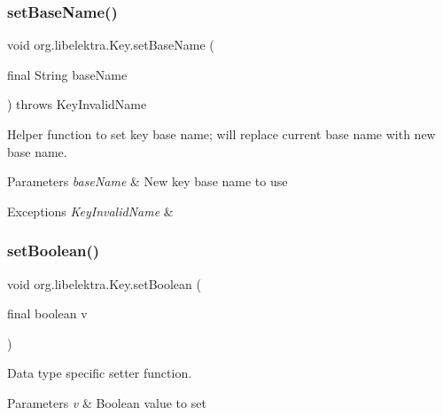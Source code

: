 \subsubsection{\texorpdfstring{set\+Base\+Name()}{setBaseName()}}
{\footnotesize\ttfamily void org.\+libelektra.\+Key.\+set\+Base\+Name (\begin{DoxyParamCaption}\item[{final String}]{base\+Name }\end{DoxyParamCaption}) throws Key\+Invalid\+Name\hspace{0.3cm}{\ttfamily [inline]}}



Helper function to set key base name; will replace current base name with new base name. 


\begin{DoxyParams}{Parameters}
{\em base\+Name} & New key base name to use \\
\hline
\end{DoxyParams}

\begin{DoxyExceptions}{Exceptions}
{\em Key\+Invalid\+Name} & \\
\hline
\end{DoxyExceptions}
\mbox{\label{classorg_1_1libelektra_1_1Key_a005125c24abc41a799d73d09c8c148f1}} 
\subsubsection{\texorpdfstring{set\+Boolean()}{setBoolean()}}
{\footnotesize\ttfamily void org.\+libelektra.\+Key.\+set\+Boolean (\begin{DoxyParamCaption}\item[{final boolean}]{v }\end{DoxyParamCaption})\hspace{0.3cm}{\ttfamily [inline]}}



Data type specific setter function. 


\begin{DoxyParams}{Parameters}
{\em v} & Boolean value to set \\
\hline
\end{DoxyParams}
\mbox{\label{classorg_1_1libelektra_1_1Key_ab9576c2e1e526ee23904a50b02386b45}} 
